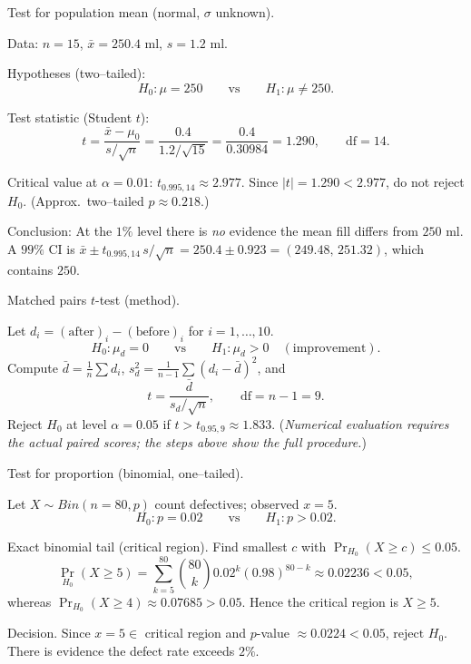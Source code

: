 \documentclass[11pt]{article}
\def\textbf#1{#1}%
\def\mathrm#1{#1}%
\begin{document}

\begin{solution}
\textbf{Test for population mean (normal, $\sigma$ unknown).}

Data: $n=15$, $\bar x=250.4$ ml, $s=1.2$ ml.

\textbf{Hypotheses (two–tailed):}
\[
H_0:\mu=250 \qquad\text{vs}\qquad H_1:\mu\neq 250.
\]

\textbf{Test statistic (Student $t$):}
\[
t=\frac{\bar x-\mu_0}{s/\sqrt n}
=\frac{0.4}{1.2/\sqrt{15}}
=\frac{0.4}{0.30984}=1.290,\qquad \text{df}=14.
\]

\textbf{Critical value at }$\alpha=0.01$: $t_{0.995,14}\approx 2.977$. Since $|t|=1.290<2.977$, do not reject $H_0$.
(Approx.\ two–tailed $p\approx 0.218$.)

\textbf{Conclusion:} At the $1\%$ level there is \emph{no} evidence the mean fill differs from $250$ ml.
A $99\%$ CI is $\bar x\pm t_{0.995,14}\,s/\sqrt n=250.4\pm 0.923=(249.48,\,251.32)$, which contains $250$.
\end{solution}


\begin{solution}
\textbf{Matched pairs $t$-test (method).}

Let $d_i=(\text{after})_i-(\text{before})_i$ for $i=1,\dots,10$.
\[
H_0:\mu_d=0 \qquad\text{vs}\qquad H_1:\mu_d>0 \quad(\text{improvement}).
\]
Compute $\bar d=\frac1{n}\sum d_i$, $s_d^2=\frac1{n-1}\sum (d_i-\bar d)^2$, and
\[
t=\frac{\bar d}{s_d/\sqrt n},\qquad \text{df}=n-1=9.
\]
Reject $H_0$ at level $\alpha=0.05$ if $t>t_{0.95,9}\approx 1.833$. 
(\emph{Numerical evaluation requires the actual paired scores; the steps above show the full procedure.})
\end{solution}


\begin{solution}
\textbf{Test for proportion (binomial, one–tailed).}

Let $X\sim\mathrm{Bin}(n=80,p)$ count defectives; observed $x=5$.
\[
H_0:p=0.02 \qquad\text{vs}\qquad H_1:p>0.02.
\]

\textbf{Exact binomial tail (critical region).}
Find smallest $c$ with $\Pr_{H_0}(X\ge c)\le 0.05$.
\[
\Pr_{H_0}(X\ge 5)=\sum_{k=5}^{80}\binom{80}{k}0.02^k(0.98)^{80-k}\approx \boxed{0.02236}<0.05,
\]
whereas $\Pr_{H_0}(X\ge 4)\approx 0.07685>0.05$. Hence the critical region is $X\ge 5$.

\textbf{Decision.} Since $x=5\in$ critical region and $p$-value $\approx0.0224<0.05$, 
$\boxed{\text{reject }H_0}$. There is evidence the defect rate exceeds $2\%$.
\end{solution}
\end{document}
